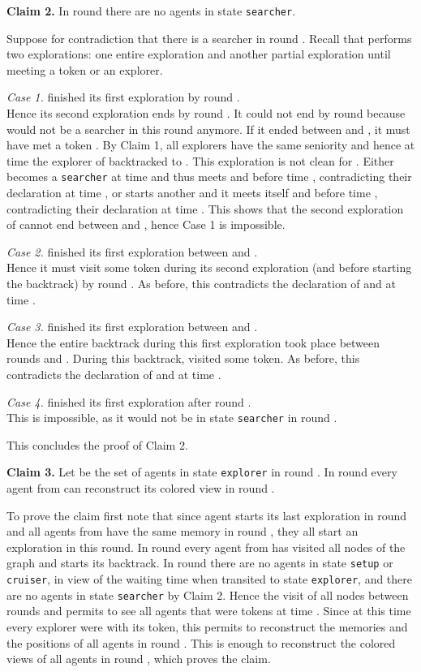 \documentclass[11pt]{article}
\newcommand{\finclaim}{\hfill }
\newcommand{\qed}{\hfill  \bigbreak}
\newenvironment{proof}{\noindent {\bf Proof.}}{\qed}
\begin{document}
\begin{proof}
 \vspace*{0.3cm}
  \noindent
{\bf Claim 2.} In round  there are no agents in state {\tt searcher}.

Suppose for contradiction that there is a searcher  in round . Recall that  performs two explorations: one entire exploration  
and another partial exploration   until meeting a token or an explorer.

  \noindent
{\em Case 1.}  finished its first exploration  by round .\\
Hence its second exploration ends by round . It could not end by round  because  would not be a searcher in this round anymore.
If it ended between  and , it must have met a token . By Claim 1, all explorers have the same seniority and hence at time  the 
explorer  of  backtracked to . This exploration is not clean for . Either  becomes a {\tt searcher} at time  and thus meets  and 
before time , contradicting their declaration at time , or  starts another   and it meets itself  and 
before time , contradicting their declaration at time . This shows that the second exploration of  cannot end between  and ,
hence Case 1 is impossible.

  \noindent
{\em Case 2.}  finished its first exploration  between  and .\\
Hence it must visit some token  during its second exploration (and before starting the backtrack) by round . As before, this contradicts 
the declaration of  and  at time .

  \noindent
{\em Case 3.}  finished its first exploration  between   and .\\
Hence the entire backtrack during this first exploration took place between rounds   and . During this backtrack,  visited some token.
As before, this contradicts 
the declaration of  and  at time .

  \noindent
{\em Case 4.}  finished its first exploration  after round .\\
This is impossible, as it would not be in state {\tt searcher} in round .

This concludes the proof of Claim 2.\finclaim

\vspace*{0.3cm}
\noindent
{\bf Claim 3.} Let  be the set of agents in state {\tt explorer} in round . 
In round  every agent from  can reconstruct its colored view in round  .

To prove the claim first note that since agent  starts its last exploration in round  and all agents from  have the same memory in round ,
they all start an exploration  in this round. In round  every agent from  has visited all nodes of the graph and starts its backtrack.
In round  there are no agents in state {\tt setup} or {\tt cruiser}, in view of the waiting time when  transited to state {\tt explorer}, and there are no agents
in state {\tt searcher} by Claim 2. Hence the visit of all nodes between rounds  and  permits to see all agents that were tokens at time .
Since at this time every explorer were with its token, this
permits to reconstruct the memories and the positions of all agents in round . This is enough to reconstruct the colored views of all agents in round  , which proves the claim.\finclaim


\end{proof}
\end{document}
